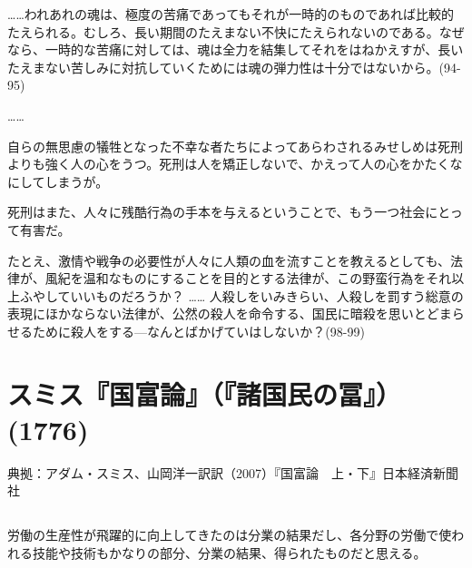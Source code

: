 ……われあれの魂は、極度の苦痛であってもそれが一時的のものであれば比較的たえられる。むしろ、長い期間のたえまない不快にたえられないのである。なぜなら、一時的な苦痛に対しては、魂は全力を結集してそれをはねかえすが、長いたえまない苦しみに対抗していくためには魂の弾力性は十分ではないから。(94-95)

……

自らの無思慮の犠牲となった不幸な者たちによってあらわされるみせしめは死刑よりも強く人の心をうつ。死刑は人を矯正しないで、かえって人の心をかたくなにしてしまうが。

死刑はまた、人々に残酷行為の手本を与えるということで、もう一つ社会にとって有害だ。

たとえ、激情や戦争の必要性が人々に人類の血を流すことを教えるとしても、法律が、風紀を温和なものにすることを目的とする法律が、この野蛮行為をそれ以上ふやしていいものだろうか？ …… 人殺しをいみきらい、人殺しを罰すう総意の表現にほかならない法律が、公然の殺人を命令する、国民に暗殺を思いとどまらせるために殺人をする{\——}なんとばかげていはしないか？(98-99)









\pagebreak{}


\section{スミス『国富論』（『諸国民の冨』）(1776)}




典拠：アダム・スミス、山岡洋一訳訳（2007）『国富論　上・下』日本経済新聞社


\subsection{}

労働の生産性が飛躍的に向上してきたのは分業の結果だし、各分野の労働で使われる技能や技術もかなりの部分、分業の結果、得られたものだと思える。

